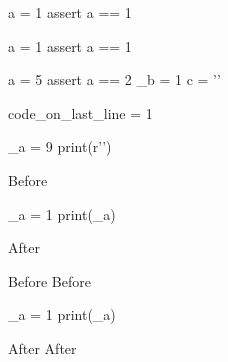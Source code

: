 \documentclass{article}
\begin{document}
\ifdefined\TestAll



\begin{python}
a = 1
assert a == 1
\end{python}

\begin{python}
    a = 1
    assert a == 1
\end{python}

\begin{python}
    a = 5 %
    assert a == 2
    _b = 1
    c = '\n'
\end{python}


\begin{python}
code_on_last_line = 1\end{python}



\begin{python}
_a = 9
print(r'')
\end{python}


\py{}
\py{ }
\pyc{}
\pyc{ }
\begin{python}
\end{python}
\begin{python}

\end{python}

\newenvironment{derivedenvA}
{\PyLTVerbatimEnv Before \begin{python}}{\end{python} After}

\begin{derivedenvA}
_a = 1
print(_a)
\end{derivedenvA}

\newenvironment{derivedenvB}
{\PyLTVerbatimEnv Before \begin{derivedenvA}}{\end{derivedenvA} After}

\begin{derivedenvB}
_a = 1
print(_a)
\end{derivedenvB}

\fi
\end{document}
